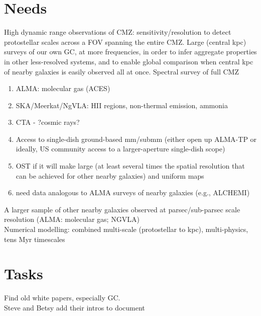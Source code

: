 \documentclass{aastex62}
\begin{document}



\section{Needs}
High dynamic range observations of CMZ: sensitivity/resolution to detect protostellar scales across a FOV spanning the entire CMZ. Large (central kpc) surveys of our own GC, at more frequencies, in order to infer aggregate properties in other less-resolved systems, and to enable global comparison when central kpc of nearby galaxies is easily observed all at once. Spectral survey of full CMZ
\begin{enumerate}
    \item ALMA: molecular gas (ACES)
    \item SKA/Meerkat/NgVLA: HII regions, non-thermal emission, ammonia
    \item CTA - ?cosmic rays?
    \item Access to single-dish ground-based mm/submm  (either open up ALMA-TP or ideally, US community access to a larger-aperture single-dish scope)
    \item OST if it will make large (at least several times the spatial resolution that can be achieved for other nearby galaxies)  and uniform maps
    \item need data analogous to ALMA surveys of nearby galaxies (e.g., ALCHEMI)
\end{enumerate}
A larger sample of other nearby galaxies observed at parsec/sub-parsec scale resolution (ALMA: molecular gas; NGVLA)\\
Numerical modelling: combined multi-scale (protostellar to kpc), multi-physics, tens Myr timescales

\section{Tasks}
Find old white papers, especially GC. \\
Steve and Betsy add their intros to document\\
\end{document}
